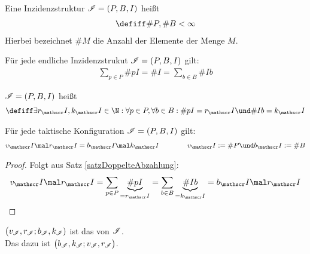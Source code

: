 \begin{definition}
	Eine Inzidenzstruktur $\mathscr{I}=(P,B,I)$ heißt 
	\begin{align*}
		\defiff \#P,\#B<\infty
	\end{align*}
	Hierbei bezeichnet $\#M$ die Anzahl der Elemente der Menge $M$.
\end{definition}

\begin{satz}\label{satzDoppelteAbzahlung}\enter
	Für jede endliche Inzidenzstrukut $\mathscr{I}=(P,B,I)$ gilt:
	\begin{align*}
		\sum\limits_{p\in P}\# pI=\#I=\sum\limits_{b\in B}\# Ib
	\end{align*}
\end{satz}

\begin{definition}
	$\mathscr{I}=(P,B,I)$ heißt 
	\begin{align*}
		\defiff\exists r_\Inz,k_\Inz\in\N:\forall p\in P,\forall b\in B:\# pI=r_\Inz\und\#Ib=k_\Inz
	\end{align*}
\end{definition}

\begin{lemma}
	Für jede taktische Konfiguration $\mathscr{I}=(P,B,I)$ gilt:
	\begin{align*}
		v_\Inz\mal r_\Inz=b_\Inz\mal k_\Inz
		\qquad\mit\qquad
		v_\Inz:=\# P\und b_\Inz:=\#B
	\end{align*}
\end{lemma}

\begin{proof}
	Folgt aus Satz \ref{satzDoppelteAbzahlung}:
	\begin{align*}
		v_\Inz\mal r_\Inz=\sum\limits_{p\in P}\underbrace{\# pI}_{=r_\Inz}=\sum\limits_{b\in B}\underbrace{\#Ib}_{=k_\Inz}=b_\Inz\mal r_\Inz
	\end{align*}
\end{proof}

\begin{definition}
	$\big(v_{\mathscr{I}},r_{\mathscr{I}};b_{\mathscr{I}},k_{\mathscr{I}})$ ist das  von $\mathscr{I}$.
	\\
	Das dazu  ist $\big(b_{\mathscr{I}},k_{\mathscr{I}};v_{\mathscr{I}},r_{\mathscr{I}}\big)$.
\end{definition}

